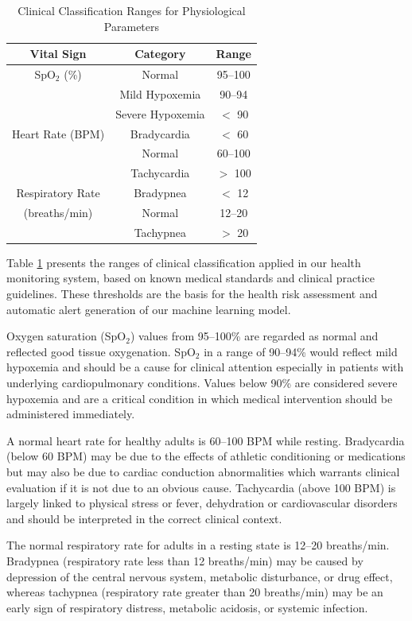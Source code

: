 \documentclass{ieeeaccess}
\begin{document}
\begin{table}[h]
\centering
\caption{Clinical Classification Ranges for Physiological Parameters\cite{b2}\cite{b35}}
\label{tab:vital_ranges}
\begin{tabular}{|c|c|c|}
\hline
\textbf{Vital Sign} & \textbf{Category} & \textbf{Range} \\
\hline
SpO$_2$ (\%) & Normal & 95--100 \\
       & Mild Hypoxemia & 90--94 \\
       & Severe Hypoxemia & $<$ 90 \\
\hline
Heart Rate (BPM) & Bradycardia & $<$ 60 \\
       & Normal & 60--100 \\
       & Tachycardia & $>$ 100 \\
\hline
Respiratory Rate & Bradypnea & $<$ 12 \\
(breaths/min) & Normal & 12--20 \\
               & Tachypnea & $>$ 20 \\
\hline
\end{tabular}
\end{table}

Table \ref{tab:vital_ranges}
presents the ranges of clinical classification applied in our health monitoring system, based on known medical standards and clinical practice guidelines. These thresholds are the basis for the health risk assessment and automatic alert generation of our machine learning model.

Oxygen saturation (SpO$_2$) values from 95--100\% are regarded as normal and reflected good tissue oxygenation. SpO$_2$ in a range of 90--94\% would reflect mild hypoxemia and should be a cause for clinical attention especially in patients with underlying cardiopulmonary conditions. Values below 90\% are considered severe hypoxemia and are a critical condition in which medical intervention should be administered immediately.

A normal heart rate for healthy adults is 60--100 BPM while resting. Bradycardia (below 60 BPM) may be due to the effects of athletic conditioning or medications but may also be due to cardiac conduction abnormalities which warrants clinical evaluation if it is not due to an obvious cause. Tachycardia (above 100 BPM) is largely linked to physical stress or fever, dehydration or cardiovascular disorders and should be interpreted in the correct clinical context.

The normal respiratory rate for adults in a resting state is 12--20 breaths/min. Bradypnea (respiratory rate less than 12 breaths/min) may be caused by depression of the central nervous system, metabolic disturbance, or drug effect, whereas tachypnea (respiratory rate greater than 20 breaths/min) may be an early sign of respiratory distress, metabolic acidosis, or systemic infection.
\end{document}

